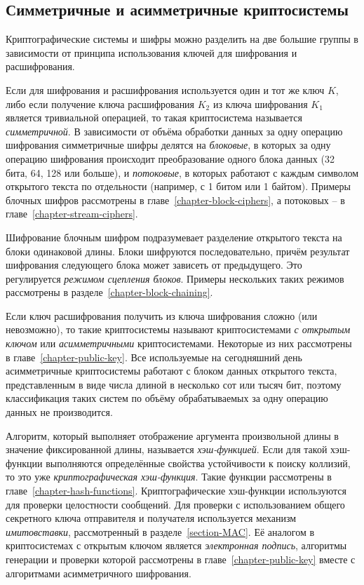 \subsection{Симметричные и асимметричные криптосистемы}

Криптографические системы и шифры можно разделить на две большие группы в зависимости от принципа использования ключей для шифрования и расшифрования.

Если для шифрования и расшифрования используется один и тот же ключ $K$, либо если получение ключа расшифрования $K_2$ из ключа шифрования $K_1$ является тривиальной операцией, то такая криптосистема называется \emph{симметричной}. В зависимости от объёма обработки данных за одну операцию шифрования симметричные шифры делятся на \emph{блоковые}, в которых за одну операцию шифрования происходит преобразование одного блока данных (32 бита, 64, 128 или больше), и \emph{потоковые}, в которых работают с каждым символом открытого текста по отдельности (например, с 1 битом или 1 байтом). Примеры блочных шифров рассмотрены в главе~\ref{chapter-block-ciphers}, а потоковых -- в главе~\ref{chapter-stream-ciphers}.

Шифрование блочным шифром подразумевает разделение открытого текста на блоки одинаковой длины. Блоки шифруются последовательно, причём результат шифрования следующего блока может зависеть от предыдущего. Это регулируется \emph{режимом сцепления блоков}. Примеры нескольких таких режимов рассмотрены в разделе~\ref{chapter-block-chaining}.

Если ключ расшифрования получить из ключа шифрования сложно (или невозможно), то такие криптосистемы называют криптосистемами \emph{с открытым ключом} или \emph{асимметричными} криптосистемами. Некоторые из них рассмотрены в главе~\ref{chapter-public-key}. Все используемые на сегодняшний день асимметричные криптосистемы работают с блоком данных открытого текста, представленным в виде числа длиной в несколько сот или тысяч бит, поэтому классификация таких систем по объёму обрабатываемых за одну операцию данных не производится.

Алгоритм, который выполняет отображение аргумента произвольной длины в значение фиксированной длины, называется \emph{хэш-функцией}. Если для такой хэш-функции выполняются определённые свойства устойчивости к поиску коллизий, то это уже \emph{криптографическая хэш-функция}. Такие функции рассмотрены в главе~\ref{chapter-hash-functions}. Криптографические хэш-функции используются для проверки целостности сообщений. Для проверки с использованием общего секретного ключа отправителя и получателя используется механизм \emph{имитовставки}, рассмотренный в разделе~\ref{section-MAC}. Её аналогом в криптосистемах с открытым ключом является \emph{электронная подпись}, алгоритмы генерации и проверки которой рассмотрены в главе~\ref{chapter-public-key} вместе с алгоритмами асимметричного шифрования.

